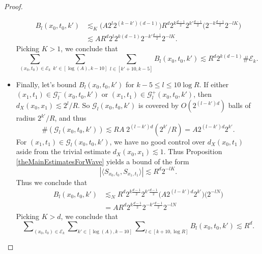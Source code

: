 \begin{proof}
\begin{itemize}
\begin{equation}
    \begin{split}
        B_l(x_0,t_0,k') &\lesssim_K \Big( A 2^{l} 2^{(k-k')(d-1)} \Big)  R^{d} 2^{k \frac{d-1}{2}} 2^{k' \frac{d-1}{2}} \Big( 2^{-k \frac{d-1}{2}} 2^{-lK} \Big)\\
        &\lesssim A R^d 2^l 2^{k(d-1)} 2^{-k' \frac{d-1}{2}} 2^{-lK}.
    \end{split}
    \end{equation}
    Picking $K > 1$, we conclude that
    \begin{equation} \label{AAAlBoundSmall}
        \sum_{(x_0,t_0) \in \mathcal{E}_k} \sum_{k' \in [\log(A), k - 10]} \sum_{l \in [k' + 10, k - 5]} B_l(x_0,t_0,k') \lesssim R^{d} 2^{k (d-1)} \# \mathcal{E}_k.
    \end{equation}

    \item Finally, let's bound $B_l(x_0,t_0,k')$ for $k - 5 \leq l \leq 10 \log R$. If either $(x_1,t_1) \in \mathcal{G}_l^-(x_0,t_0,k')$ or $(x_1,t_1) \in \mathcal{G}_l^+(x_0,t_0,k')$, then $d_X(x_0,x_1) \lesssim 2^l / R$. So $\mathcal{G}_l(x_0,t_0,k')$ is covered by $O( 2^{(l-k')d} )$ balls of radius $2^{k'} / R$, and thus
    \begin{equation}
        \#(\mathcal{G}_l(x_0,t_0,k')) \lesssim R A\; 2^{(l-k')d} (2^{k'} / R) = A 2^{(l-k')d} 2^{k'}.
    \end{equation}
    For $(x_1,t_1) \in \mathcal{G}_l(x_0,t_0,k')$, we have no good control over $d_X(x_0,t_1)$ aside from the trivial estimate $d_X(x_0,x_1) \lesssim 1$. Thus Proposition \ref{theMainEstimatesForWave} yields a bound of the form
    \begin{equation}
        |\langle {S\!}_{x_0,t_0}, {S\!}_{x_1,t_1} \rangle| \lesssim R^d 2^{-lK}.
    \end{equation}
    Thus we conclude that
    \begin{equation}
    \begin{split}
        B_l(x_0,t_0,k') &\lesssim_N R^{d} 2^{k \frac{d-1}{2}} 2^{k' \frac{d-1}{2}} \Big( A 2^{(l-k')d} 2^{k'} \Big) \Big( 2^{-lN} \Big)\\
        &= A R^d 2^{k \frac{d-1}{2}} 2^{-k' \frac{d-1}{2}} 2^{-lN}
    \end{split}
    \end{equation}
    Picking $K > d$, we conclude that
    \begin{equation} \label{AAAlBoundBig}
        \sum\nolimits_{(x_0,t_0) \in \mathcal{E}_k} \sum\nolimits_{k' \in [\log(A), k - 10]} \sum\nolimits_{l \in [k+10,\log R]} B_l(x_0,t_0,k')  \lesssim R^d.

\end{equation}
\end{itemize}
\end{proof}
